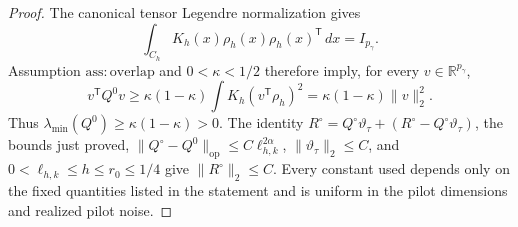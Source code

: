 \documentclass{article}
\begin{document}
\begin{proof}
The canonical tensor Legendre normalization gives
\[
 \int_{C_h}K_h(x)\rho_h(x)\rho_h(x)^{\mathsf T}\,dx=I_{p_\gamma}.
\]
Assumption \(\mathrm{ass{:}overlap}\) and \(0<\kappa<1/2\) therefore imply, for every \(v\in\mathbb R^{p_\gamma}\),
\[
 v^{\mathsf T}Q^0v
 \ge\kappa(1-\kappa)\int K_h(v^{\mathsf T}\rho_h)^2
 =\kappa(1-\kappa)\lVert v\rVert_2^2.
\]
Thus \(\lambda_{\min}(Q^0)\ge\kappa(1-\kappa)>0\).  The identity \(R^\circ=Q^\circ\vartheta_\tau+(R^\circ-Q^\circ\vartheta_\tau)\), the bounds just proved, \(\lVert Q^\circ-Q^0\rVert_{\mathrm{op}}\le C\ell_{h,k}^{2\alpha}\), \(\lVert\vartheta_\tau\rVert_2\le C\), and \(0<\ell_{h,k}\le h\le r_0\le1/4\) give \(\lVert R^\circ\rVert_2\le C\).  Every constant used depends only on the fixed quantities listed in the statement and is uniform in the pilot dimensions and realized pilot noise.
\end{proof}
\end{document}
